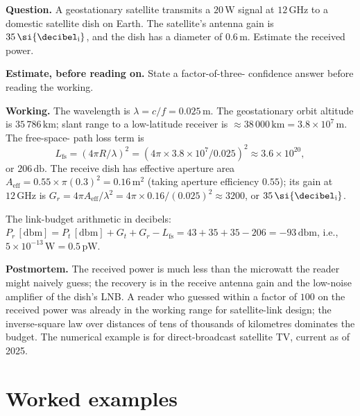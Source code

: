 \begin{estimation}
\textbf{Question.} A geostationary satellite transmits a $20\,\si{
\watt}$ signal at $12\,\si{\giga\hertz}$ to a domestic satellite dish
on Earth. The satellite's antenna gain is $35\,\si{\decibel
\textsubscript{i}}$, and the dish has a diameter of $0.6\,\si{\meter}$.
Estimate the received power.

\textbf{Estimate, before reading on.} State a factor-of-three-
confidence answer before reading the working.

\textbf{Working.} The wavelength is $\lambda = c/f = 0.025\,\si{
\meter}$. The geostationary orbit altitude is $35\,786\,\si{\kilo
\meter}$; slant range to a low-latitude receiver is $\approx 38\,000
\,\si{\kilo\meter} = 3.8\times 10^{7}\,\si{\meter}$. The free-space-
path loss term is
\[
L_{\text{fs}} = (4\pi R/\lambda)^{2} = (4\pi\times 3.8\times 10^{7}/
0.025)^{2} \approx 3.6\times 10^{20},
\]
or $206\,\si{\decibel}$. The receive dish has effective aperture area
$A_{\text{eff}} = 0.55\times \pi(0.3)^{2} = 0.16\,\si{\meter}^{2}$
(taking aperture efficiency $0.55$); its gain at $12\,\si{\giga\hertz}$
is $G_{r} = 4\pi A_{\text{eff}}/\lambda^{2} = 4\pi\times 0.16/
(0.025)^{2} \approx 3200$, or $35\,\si{\decibel\textsubscript{i}}$.

The link-budget arithmetic in decibels: $P_{r}\,[\si{\decibel}\text{m}]
= P_{t}\,[\si{\decibel}\text{m}] + G_{t} + G_{r} - L_{\text{fs}} = 43
+ 35 + 35 - 206 = -93\,\si{\decibel}\text{m}$, i.e., $5\times 10^{-13}
\,\si{\watt} = 0.5\,\si{\pico\watt}$.

\textbf{Postmortem.} The received power is much less than the
microwatt the reader might naively guess; the recovery is in the
receive antenna gain and the low-noise amplifier of the dish's LNB.
A reader who guessed within a factor of $100$ on the received power
was already in the working range for satellite-link design; the
inverse-square law over distances of tens of thousands of kilometres
dominates the budget. The numerical example is for direct-broadcast
satellite TV, current as of 2025.
\end{estimation}

\section{Worked examples}

